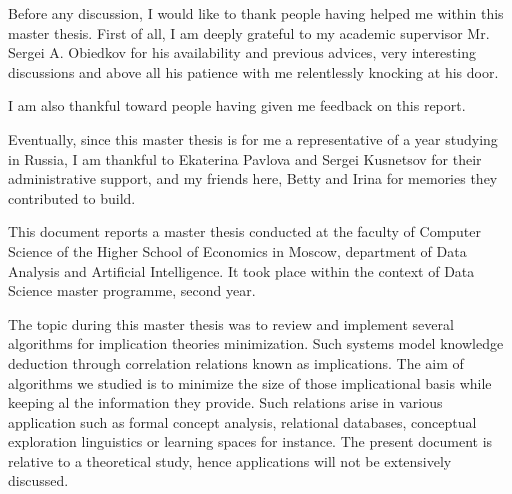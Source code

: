 \documentclass[a4paper]{report}
\begin{document}
	

	



Before any discussion, I would like to thank people having helped me within this master thesis. First of all, I am deeply grateful to my academic supervisor Mr. Sergei A. Obiedkov for his availability and previous advices, very interesting discussions and above all his patience with me relentlessly knocking at his door.

I am also thankful toward people having given me feedback on this report.

Eventually, since this master thesis is for me a representative of a year studying in Russia, I am thankful to Ekaterina Pavlova and Sergei Kusnetsov for their administrative support, and my friends here, Betty and Irina for memories they contributed to build.

\newpage
\listoffigures
\newpage

\newpage
\listoftables
\newpage

\newpage
\listofalgorithms
\newpage



\tableofcontents



This document reports a master thesis conducted at the faculty of Computer Science of the Higher School of Economics in Moscow, department of Data Analysis and Artificial Intelligence. It took place within the context of Data Science master programme, second year.

\vspace{1.2em}

The topic during this master thesis was to review and implement several algorithms for implication theories minimization. Such systems model knowledge deduction through correlation relations known as implications. The aim of algorithms we studied is to minimize the size of those implicational basis while
keeping al the information they provide. Such relations arise in various application such as formal concept analysis, relational databases, conceptual exploration linguistics or learning spaces for instance. The present
document is relative to a theoretical study, hence applications will not be extensively discussed.
\end{document}
